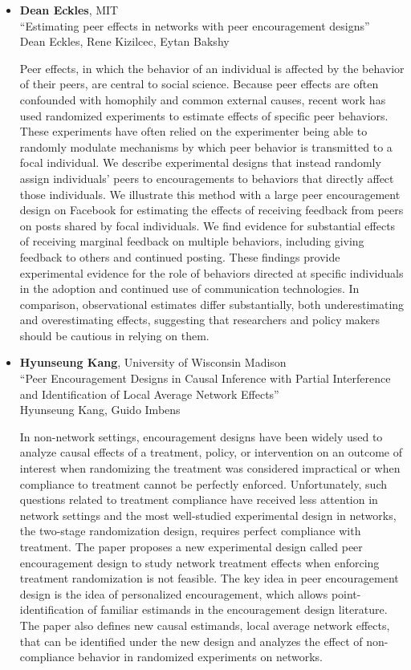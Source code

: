 \begin{itemize}
\item \textbf{Dean Eckles}, MIT \\
``Estimating peer effects in networks with peer encouragement designs'' \\
Dean Eckles, Rene Kizilcec, Eytan Bakshy


Peer effects, in which the behavior of an individual is affected by the behavior of their peers, are central to social science. Because peer effects are often confounded with homophily and common external causes, recent work has used randomized experiments to estimate effects of specific peer behaviors. These experiments have often relied on the experimenter being able to randomly modulate mechanisms by which peer behavior is transmitted to a focal individual. We describe experimental designs that instead randomly assign individuals’ peers to encouragements to behaviors that directly affect those individuals. We illustrate this method with a large peer encouragement design on Facebook for estimating the effects of receiving feedback from peers on posts shared by focal individuals. We find evidence for substantial effects of receiving marginal feedback on multiple behaviors, including giving feedback to others and continued posting. These findings provide experimental evidence for the role of behaviors directed at specific individuals in the adoption and continued use of communication technologies. In comparison, observational estimates differ substantially, both underestimating and overestimating effects, suggesting that researchers and policy makers should be cautious in relying on them.

\item \textbf{Hyunseung Kang}, University of Wisconsin Madison \\
``Peer Encouragement Designs in Causal Inference with Partial Interference and Identification of Local Average Network Effects'' \\
Hyunseung Kang, Guido Imbens


In non-network settings, encouragement designs have been widely used to analyze causal effects of a treatment, policy, or intervention on an outcome of interest when randomizing the treatment was considered impractical or when compliance to treatment cannot be perfectly enforced. Unfortunately, such questions related to treatment compliance have received less attention in network settings and the most well-studied experimental design in networks, the two-stage randomization design, requires perfect compliance with treatment. The paper proposes a new experimental design called peer encouragement design to study network treatment effects when enforcing treatment randomization is not feasible. The key idea in peer encouragement design is the idea of personalized  encouragement, which allows point-identification of familiar estimands in the encouragement design literature. The paper also defines new causal estimands, local average network effects, that can be identified under the new design and analyzes the effect of non-compliance behavior in randomized experiments on networks.


\end{itemize}
